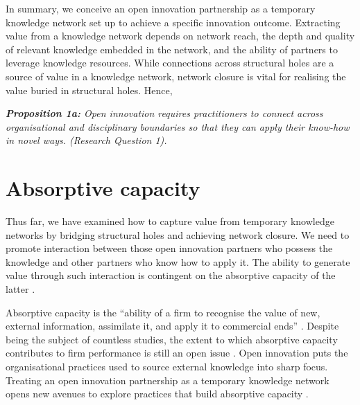 In summary, we conceive an open innovation partnership as a temporary knowledge network set up to achieve a specific innovation outcome. Extracting value from a knowledge network depends on network reach, the depth and quality of relevant knowledge embedded in the network, and the ability of partners to leverage knowledge resources. While connections across structural holes are a source of value in a knowledge network, network closure is vital for realising the value buried in structural holes. Hence, \bigskip

\begin{tcolorbox}
\textit{\textbf{Proposition 1a:} Open  innovation  requires  practitioners  to  connect across organisational and disciplinary boundaries so that they can apply their know-how in novel ways. (Research Question 1).}
\end{tcolorbox}

\section{Absorptive capacity} 

Thus far, we have examined how to capture value from temporary knowledge networks by bridging structural holes and achieving network closure. We need to promote interaction between those open innovation partners who possess the knowledge and other partners who know how to apply it. The ability to generate value through such interaction is contingent on the absorptive capacity of the latter \citep{vanhaverbeke2007connecting,lichtenthaler2009capability,robertson2012managing,xia2016unpacking}. \medskip

Absorptive capacity is the \enquote{ability of a firm to recognise the value of new, external information, assimilate it, and apply it to commercial ends} \citep{cohen1990absorptive}. Despite being the subject of countless studies, the extent to which absorptive capacity contributes to firm performance is still an open issue \citep{omidvar2013revisiting,duchek2013capturing}. Open innovation puts the organisational practices used to source external knowledge into sharp focus. Treating an open innovation partnership as a temporary knowledge network opens new avenues to explore practices that build absorptive capacity \citep{vanhaverbeke2007connecting,xia2016unpacking}. \medskip

